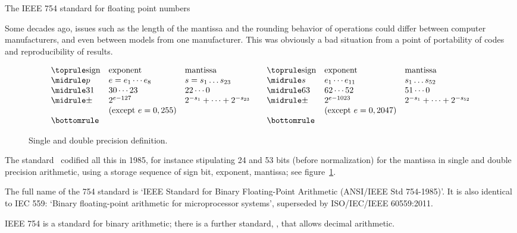  {The IEEE 754 standard for floating point numbers}
\label{sec:ieee754}

Some decades ago, issues such as the length of the
mantissa and the rounding behavior of operations
could differ between computer manufacturers, and even between models
from one manufacturer. This was obviously a bad situation from a point
of portability of codes and reproducibility of results.
\begin{figure}[ht]
  \begin{equation}
  \begin{array}{ l l l }
    \toprule
    \hbox{sign}&\hbox{exponent}&\hbox{mantissa}\\
    \midrule
    p&e=e_1\cdots e_8 &s=s_1\dots s_{23}\\
    \midrule
    31&30\cdots 23&22\cdots 0\\
    \midrule
    \pm & 2^{e-127} & 2^{-s_1}+\cdots + 2^{-s_{23}} \\
    & \hbox{(except $e=0,255$)} & \\
    \bottomrule
  \end{array}\quad
  \begin{array}{ lll }
    \toprule
    \hbox{sign}&\hbox{exponent}&\hbox{mantissa}\\
    \midrule
    s&e_1\cdots e_{11}&s_1\dots s_{52}\\
    \midrule
    63&62\cdots 52&51\cdots 0\\
    \midrule
    \pm & 2^{e-1023} & 2^{-s_1}+\cdots + 2^{-s_{52}} \\
    & \hbox{(except $e=0,2047$)} & \\
    \bottomrule
  \end{array}
  \end{equation}
  \caption{Single and double precision definition.}
  \label{fig:single-double}
\end{figure}
The  standard~\cite{754-2019}
codified all this in 1985, for instance stipulating 24 and 53 bits
(before normalization)
for the
mantissa in single and double precision arithmetic,
using a storage sequence of sign bit, exponent, mantissa;
see figure~\ref{fig:single-double}.

\begin{remark}
  The full name of the 754 standard is `IEEE Standard for Binary
  Floating-Point Arithmetic (ANSI/IEEE Std 754-1985)'. It is also
  identical to IEC 559: `Binary floating-point arithmetic for
  microprocessor systems', superseded by ISO/IEC/IEEE 60559:2011.

  IEEE 754 is a standard for binary arithmetic;
  there is a further standard,
  , that allows decimal arithmetic.
\end{remark}

